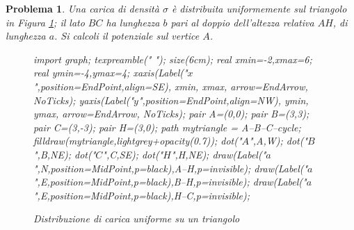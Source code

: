 \documentclass[a4paper,oneside]{article}
\newtheorem{problema}{Problema}
\let\oldhat\hat
\renewcommand{\vec}[1]{\mathbf{#1}}
\renewcommand{\hat}[1]{\widehat{\mathbf{#1}}}
\begin{document}
\begin{problema}
	Una carica di densità $\sigma$ è distribuita uniformemente sul triangolo in Figura
	\ref{fig:potenziale_triangolo}; il lato $BC$ ha lunghezza $b$ pari al doppio
	dell'altezza relativa $AH$, di lunghezza $a$. Si calcoli il potenziale sul vertice $A$.
	\begin{figure}[H]
			\centering
			\begin{asy}
				import graph;
				texpreamble("\let\oldhat\hat
				\renewcommand{\vec}[1]{\mathbf{#1}}
				\renewcommand{\hat}[1]{\oldhat{\mathbf{#1}}}");
				size(6cm);
				real xmin=-2,xmax=6;
				real ymin=-4,ymax=4;
				xaxis(Label("\small $x$",position=EndPoint,align=SE),
				xmin, xmax, arrow=EndArrow, NoTicks);
				yaxis(Label("\small $y$",position=EndPoint,align=NW),
				ymin, ymax, arrow=EndArrow, NoTicks);
				pair A=(0,0);
				pair B=(3,3);
				pair C=(3,-3);
				pair H=(3,0);
				path mytriangle = A--B--C--cycle;
				filldraw(mytriangle,lightgrey+opacity(0.7));
				dot("\small $A$",A,W);
				dot("\small $B$",B,NE);
				dot("\small $C$",C,SE);
				dot("\small $H$",H,NE);
				draw(Label("\small $a$",N,position=MidPoint,p=black),A--H,p=invisible);
				draw(Label("\small $a$",E,position=MidPoint,p=black),B--H,p=invisible);
				draw(Label("\small $a$",E,position=MidPoint,p=black),H--C,p=invisible);
			\end{asy}
			\caption{Distribuzione di carica uniforme su un triangolo}
			\label{fig:potenziale_triangolo}
		\end{figure}
\end{problema}
\end{document}
